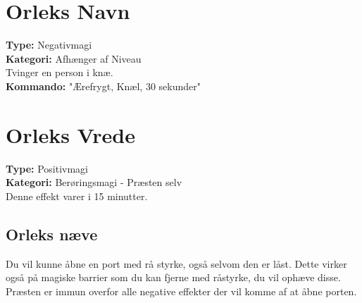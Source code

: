 \section{Orleks Navn}
\textbf{Type:} Negativmagi\\ 
\textbf{Kategori:} Afhænger af Niveau\\
Tvinger en person i knæ.\\
\textbf{Kommando:} "Ærefrygt, Knæl, 30 sekunder"

\section{Orleks Vrede}
\textbf{Type:} Positivmagi\\
\textbf{Kategori:} Berøringsmagi - Præsten selv\\
Denne effekt varer i 15 minutter.\\

\subsection{Orleks næve}
Du vil kunne åbne en port med rå styrke, også selvom den er låst. Dette virker også på magiske barrier som du kan fjerne med råstyrke, du vil ophæve disse. Præsten er immun overfor alle negative effekter der vil komme af at åbne porten.\\
